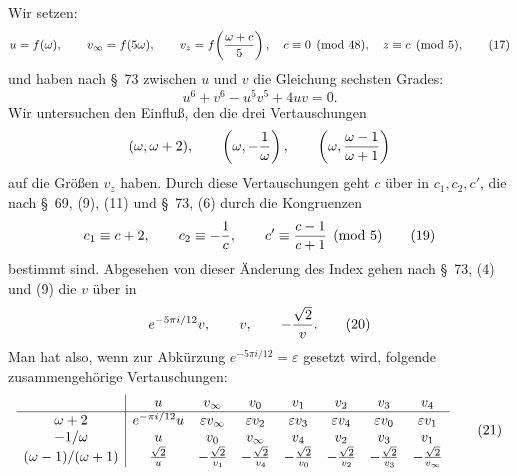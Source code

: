 \documentclass[11pt]{article}
\begin{document}
Wir setzen:
\begin{equation}
 u=f(\omega),\qquad v_\infty=f(5\omega),\qquad
 v_z=f\!\left({\omega+c\over5}\right),
\quad c\equiv0\pmod{48},\quad z\equiv c\pmod5,
\tag{17}
\end{equation}
und haben nach \S~73 zwischen \(u\) und \(v\) die Gleichung sechsten Grades:
\begin{equation}
 u^6+v^6-u^5v^5+4uv=0.
\tag{18}
\end{equation}
Wir untersuchen den Einfluß, den die drei Vertauschungen
\[
(\omega,\omega+2),\qquad
\left(\omega,-{1\over\omega}\right),\qquad
\left(\omega,{\omega-1\over\omega+1}\right)
\]
auf die Größen \(v_z\) haben. Durch diese Vertauschungen geht \(c\) über in \(c_1,c_2,c'\), die nach \S~69, (9), (11) und \S~73, (6) durch die Kongruenzen
\begin{equation}
 c_1\equiv c+2,\qquad c_2\equiv-{1\over c},\qquad
 c'\equiv {c-1\over c+1}\pmod5
\tag{19}
\end{equation}
bestimmt sind. Abgesehen von dieser Änderung des Index gehen nach \S~73, (4) und (9) die \(v\) über in
\begin{equation}
 e^{-5\pi i/12}v,\qquad v,\qquad -{\sqrt2\over v}.
\tag{20}
\end{equation}
Man hat also, wenn zur Abkürzung \(e^{-5\pi i/12}=\varepsilon\) gesetzt wird, folgende zusammengehörige Vertauschungen:
\begin{equation}
\begin{array}{c|ccccccc}
&u&v_\infty&v_0&v_1&v_2&v_3&v_4\\ \hline
\omega+2&
 e^{-\pi i/12}u&\varepsilon v_\infty&\varepsilon v_2&\varepsilon v_3&\varepsilon v_4&\varepsilon v_0&\varepsilon v_1\\
-1/\omega&
 u&v_0&v_\infty&v_4&v_2&v_3&v_1\\
(\omega-1)/(\omega+1)&
 {\sqrt2\over u}&-{\sqrt2\over v_1}&-{\sqrt2\over v_4}&-{\sqrt2\over v_0}
 &-{\sqrt2\over v_2}&-{\sqrt2\over v_3}&-{\sqrt2\over v_\infty}
\end{array}
\tag{21}
\end{equation}
\end{document}

